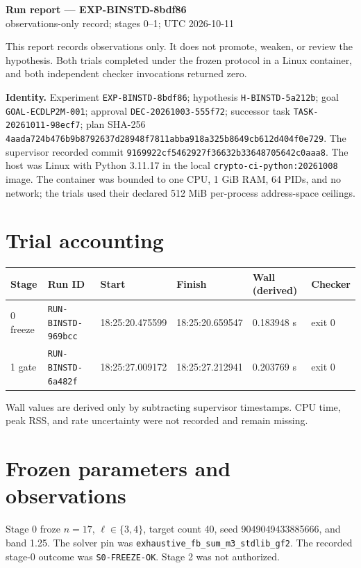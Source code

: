 \documentclass[10pt]{article}
\newcommand{\code}[1]{\texttt{\small #1}}
\begin{document}
\begin{center}
{\Large\bfseries Run report --- EXP-BINSTD-8bdf86}\\
{\small observations-only record; stages 0--1; UTC 2026-10-11}
\end{center}

This report records observations only. It does not promote, weaken, or review the hypothesis. Both trials completed under the frozen protocol in a Linux container, and both independent checker invocations returned zero.

\textbf{Identity.} Experiment \code{EXP-BINSTD-8bdf86}; hypothesis \code{H-BINSTD-5a212b}; goal \code{GOAL-ECDLP2M-001}; approval \code{DEC-20261003-555f72}; successor task \code{TASK-20261011-98ecf7}; plan SHA-256 \code{4aada724b476b9b8792637d28948f7811abba918a325b8649cb612d404f0e729}. The supervisor recorded commit \code{9169922cf5462927f36632b33648705642c0aaa8}. The host was Linux with Python 3.11.17 in the local \code{crypto-ci-python:20261008} image. The container was bounded to one CPU, 1 GiB RAM, 64 PIDs, and no network; the trials used their declared 512 MiB per-process address-space ceilings.

\section*{Trial accounting}
\begin{center}
\begin{tabular}{llllll}
\toprule
Stage & Run ID & Start & Finish & Wall (derived) & Checker\\
\midrule
0 freeze & \code{RUN-BINSTD-969bcc} & 18:25:20.475599 & 18:25:20.659547 & 0.183948 s & exit 0\\
1 gate & \code{RUN-BINSTD-6a482f} & 18:25:27.009172 & 18:25:27.212941 & 0.203769 s & exit 0\\
\bottomrule
\end{tabular}
\end{center}
Wall values are derived only by subtracting supervisor timestamps. CPU time, peak RSS, and rate uncertainty were not recorded and remain missing.

\section*{Frozen parameters and observations}
Stage 0 froze $n=17$, $\ell\in\{3,4\}$, target count 40, seed 9049049433885666, and band 1.25. The solver pin was \code{exhaustive\_fb\_sum\_m3\_stdlib\_gf2}. The recorded stage-0 outcome was \code{S0-FREEZE-OK}. Stage 2 was not authorized.
\end{document}

